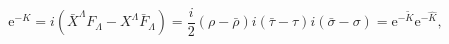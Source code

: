 \begin{equation}\mathrm{e}^{-K}=i(\bar X^\Lambda F_\Lambda-X^\Lambda\bar
F_\Lambda)=\frac i 2 (\rho-\bar\rho)i(\bar\tau
-\tau)i(\bar\sigma-\sigma)=\mathrm{e}^{-\tilde K}
\mathrm{e}^{-\hat K},\label{kaehlerpot}\end{equation} 
